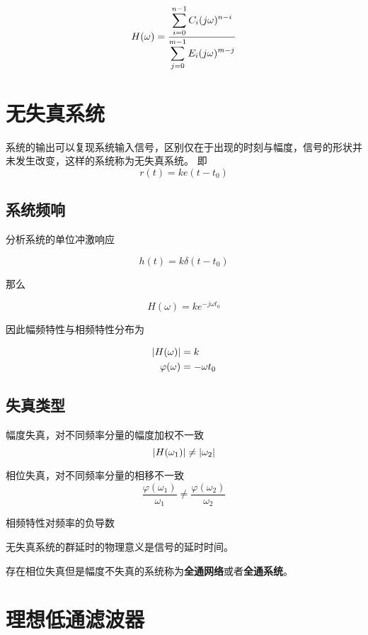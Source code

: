 \documentclass[cn,11pt,chinese,black,simple]{../elegantbook}
\begin{document}
\[ H(\omega) = \dfrac{\displaystyle\sum_{i = 0}^{n-1} C_i(j \omega)^{n - i}}{\displaystyle\sum_{j = 0}^{m-1} E_i (j \omega)^{m-j}} \]


\section{无失真系统}

\begin{definition}[无失真系统]
    系统的输出可以复现系统输入信号，区别仅在于出现的时刻与幅度，信号的形状并未发生改变，这样的系统称为无失真系统。
    即
    \[r(t) = k e(t - t_0)\]
\end{definition}

\subsection{系统频响}

分析系统的单位冲激响应

\[h(t) = k \delta(t - t_0)\]

那么

\[H(\omega) = k e^{-j \omega t_0}\]

因此幅频特性与相频特性分布为

\begin{equation*}
    \begin{aligned}
        \left| H(\omega) \right| &= k \\
        \varphi(\omega) &= - \omega t_0
    \end{aligned}
\end{equation*}

\subsection{失真类型}

幅度失真，对不同频率分量的幅度加权不一致 \[\left| H(\omega_1) \right| \neq \left| \omega_2 \right|\]

相位失真，对不同频率分量的相移不一致 \[\dfrac{\varphi(\omega_1)}{\omega_1} \neq \dfrac{\varphi(\omega_2)}{\omega_2}\]

\begin{definition}[群延时]
    相频特性对频率的负导数 
\end{definition}

无失真系统的群延时的物理意义是信号的延时时间。

存在相位失真但是幅度不失真的系统称为\textbf{全通网络}或者\textbf{全通系统}。

\section{理想低通滤波器}
\end{document}

